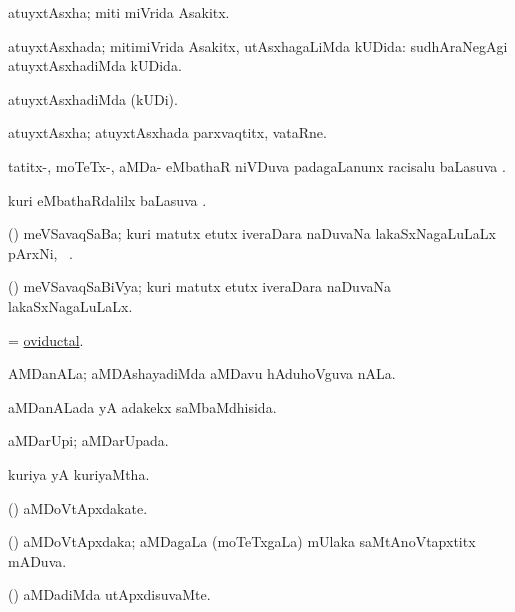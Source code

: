 \bentry
{}
\gl{\nA}
\bmng
atuyxtAsxha; miti miVrida Asakitx. 
\emng
\eentry

\bentry
{}
\gl{\gu}
\bmng
atuyxtAsxhada; mitimiVrida Asakitx, utAsxhagaLiMda kUDida:  sudhAraNegAgi atuyxtAsxhadiMda kUDida. 
\emng
\eentry

\bentry
{}
\gl{\kirxvi}
\bmng
atuyxtAsxhadiMda (kUDi). 
\emng
\eentry

\bentry
{}
\gl{\nA}
\bmng
atuyxtAsxha; atuyxtAsxhada parxvaqtitx, vataRne. 
\emng
\eentry

\bentry
{}
\gl{\sapUpa}
\bmng
tatitx-, moTeTx-, aMDa- eMbathaR niVDuva padagaLanunx racisalu baLasuva \sapUpa. 
\emng
\eentry

\bentry
{}
\gl{\sapUpa}
\bmng
kuri eMbathaRdalilx baLasuva \sapUpa. 
\emng
\eentry

\bentry
{}
\gl{\nA}
\bmng
(\pArxvi) meVSavaqSaBa; kuri matutx etutx iveraDara naDuvaNa lakaSxNagaLuLaLx pArxNi, \udA\ . 
\emng
\eentry

\bentry
{}
\gl{\gu}
\bmng
(\pArxvi) meVSavaqSaBiVya; kuri matutx etutx iveraDara naDuvaNa lakaSxNagaLuLaLx. 
\emng
\eentry

\bentry
{}
\gl{\gu}
\bmng
= \hyperlink{oviductal}{oviductal}. 
\emng
\eentry

\bentry
{}
\gl{\nA}
\bmng
AMDanALa; aMDAshayadiMda aMDavu hAduhoVguva nALa. 
\emng
\eentry

\bentry
{}
\gl{\gu}
\bmng
aMDanALada yA adakekx saMbaMdhisida. 
\emng
\eentry

\bentry
{}
\gl{\gu}
\bmng
aMDarUpi; aMDarUpada. 
\emng
\eentry

\bentry
{}
\gl{\gu}
\bmng
kuriya yA kuriyaMtha. 
\emng
\eentry

\bentry
{}
\gl{\nA}
\bmng
(\pArxvi) aMDoVtApxdakate. 
\emng
\eentry

\bentry
{}
\gl{\gu}
\bmng
(\pArxvi) aMDoVtApxdaka; aMDagaLa (moTeTxgaLa) mUlaka saMtAnoVtapxtitx mADuva. 
\emng
\eentry

\bentry
{}
\gl{\kirxvi}
\bmng
(\pArxvi) aMDadiMda utApxdisuvaMte. 
\emng
\eentry

